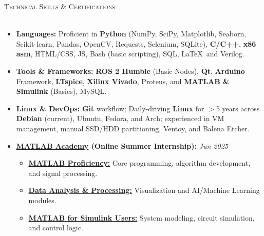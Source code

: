 \documentclass[a4paper]{article}
\newcommand{\lineunder} {
    \vspace*{-8pt} \\
    \hspace*{-18pt} \hrulefill \\
}
\newcommand{\header} [1] {
    {\hspace*{-18pt}\vspace*{6pt} \textsc{#1}}
    \vspace*{-6pt} \lineunder
}
\begin{document}
\header{Technical Skills \& Certifications}
\begin{itemize} \itemsep 1pt
    \item \textbf{Languages:} Proficient in \textbf{Python} (NumPy, SciPy, Matplotlib, Seaborn, Scikit-learn, Pandas, OpenCV, Requests, Selenium, SQLite), \textbf{C/C++}, \textbf{x86 asm}, HTML/CSS, JS, Bash (basic scripting), SQL, \LaTeX\, and Verilog.
    \item \textbf{Tools \& Frameworks:} \textbf{ROS 2 Humble} (Basic Nodes), \textbf{Qt}, \textbf{Arduino} Framework, \textbf{LTspice}, \textbf{Xilinx Vivado}, Proteus, and \textbf{MATLAB \& Simulink} (Basics), MySQL.
    \item \textbf{Linux \& DevOps:} \textbf{Git} workflow; Daily-driving \textbf{Linux} for $>$5 years across \textbf{Debian} (current), Ubuntu, Fedora, and Arch; experienced in VM management, manual SSD/HDD partitioning, Ventoy, and Balena Etcher.
    \item \textbf{\href{https://matlabacademy.mathworks.com/?page=1&sort=featured}{MATLAB Academy} (Online Summer Internship):} \hfill \textit{Jun 2025}
    \begin{itemize}
        \item \href{https://www.credly.com/badges/5c9e05db-f4b5-4435-a360-226a04411a5e}{\textbf{MATLAB Proficiency:}} Core programming, algorithm development, and signal processing.
        \item \href{https://www.credly.com/badges/47d8690a-7a2d-4248-9c41-27fc8f8edc62}{\textbf{Data Analysis \& Processing:}} Visualization and AI/Machine Learning modules.
        \item \href{https://www.credly.com/badges/f69c1b8e-5a25-423f-9eba-db02fd2b6fb2}{\textbf{MATLAB for Simulink Users:}} System modeling, circuit simulation, and control logic.
    \end{itemize}
\end{itemize}
\end{document}
